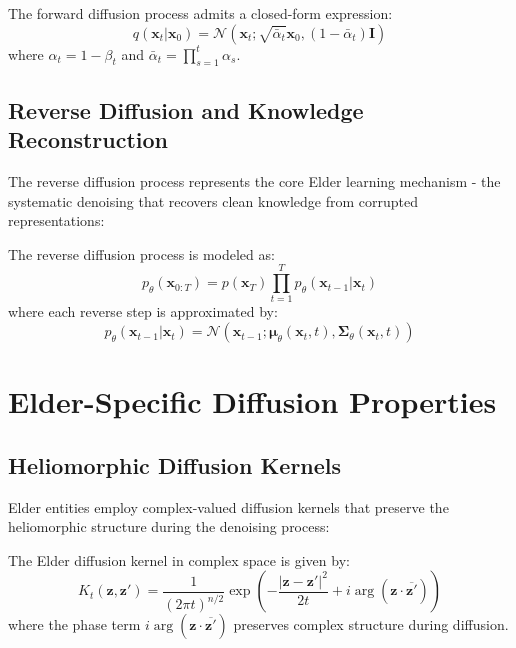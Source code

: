 \begin{theorem}
The forward diffusion process admits a closed-form expression:
\begin{equation}
q(\mathbf{x}_t | \mathbf{x}_0) = \mathcal{N}(\mathbf{x}_t; \sqrt{\bar{\alpha}_t}\mathbf{x}_0, (1-\bar{\alpha}_t)\mathbf{I})
\end{equation}
where $\alpha_t = 1 - \beta_t$ and $\bar{\alpha}_t = \prod_{s=1}^t \alpha_s$.
\end{theorem}

\subsection{Reverse Diffusion and Knowledge Reconstruction}

The reverse diffusion process represents the core Elder learning mechanism - the systematic denoising that recovers clean knowledge from corrupted representations:

\begin{definition}
The reverse diffusion process is modeled as:
\begin{equation}
p_\theta(\mathbf{x}_{0:T}) = p(\mathbf{x}_T) \prod_{t=1}^T p_\theta(\mathbf{x}_{t-1} | \mathbf{x}_t)
\end{equation}
where each reverse step is approximated by:
\begin{equation}
p_\theta(\mathbf{x}_{t-1} | \mathbf{x}_t) = \mathcal{N}(\mathbf{x}_{t-1}; \boldsymbol{\mu}_\theta(\mathbf{x}_t, t), \boldsymbol{\Sigma}_\theta(\mathbf{x}_t, t))
\end{equation}
\end{definition}

\section{Elder-Specific Diffusion Properties}

\subsection{Heliomorphic Diffusion Kernels}

Elder entities employ complex-valued diffusion kernels that preserve the heliomorphic structure during the denoising process:

\begin{definition}
The Elder diffusion kernel in complex space is given by:
\begin{equation}
K_t(\mathbf{z}, \mathbf{z}') = \frac{1}{(2\pi t)^{n/2}} \exp\left(-\frac{|\mathbf{z} - \mathbf{z}'|^2}{2t} + i\arg(\mathbf{z} \cdot \overline{\mathbf{z}'})\right)
\end{equation}
where the phase term $i\arg(\mathbf{z} \cdot \overline{\mathbf{z}'})$ preserves complex structure during diffusion.
\end{definition}

